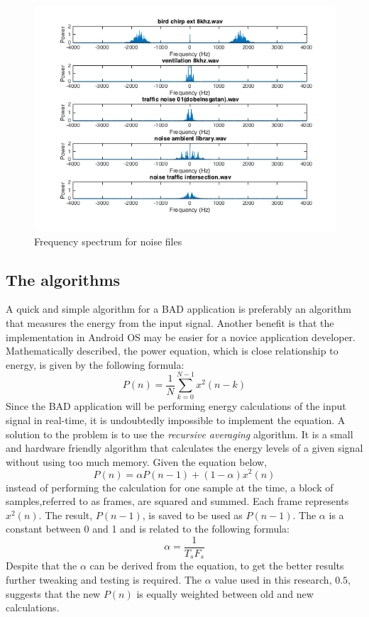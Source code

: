 \begin{figure}[H]
  \centering
  \includegraphics[width=1\textwidth]{sections/freq_spec_noise_2.png}
  \caption{Frequency spectrum for noise files}
  \label{fig:noise_spec}
\end{figure}

\subsection{The algorithms}
A quick and simple algorithm for a BAD application is preferably an algorithm that measures the 
energy from the input signal. Another benefit is that the implementation in Android OS may be easier
for a novice application developer.
Mathematically described, the power equation, which is close relationship to energy, is given by the following formula: 
\[
P(n) = \frac{1}{N} \sum\limits_{k=0}^{N-1} x^2(n-k)
\]
Since the BAD application will be performing energy calculations of the input signal in 
real-time, it is undoubtedly impossible to implement the equation. A solution to the problem is to use the 
\emph{recursive averaging} algorithm. It is a small and hardware friendly algorithm that calculates the energy 
levels of a given signal without using too much memory. Given the equation below,
\[
P(n) = \alpha P(n-1)+(1-\alpha)x^2(n)
\]
instead of performing the calculation for one sample at the time, a block of samples,referred to as frames,
are squared and summed. Each frame represents $x^2(n)$. The result, $P(n-1)$, is saved to be used as $P(n-1)$. 
The $\alpha$ is a constant between 0 and 1 and is related to the following formula:
\[
\alpha = \frac{1}{T_{s}F_{s}}
\]
Despite that the $\alpha$ can be derived from the equation, to get the better results further tweaking and testing is required.
The $\alpha$ value used in this research, $0.5$, suggests that the new $P(n)$ is equally weighted between old and new calculations.

